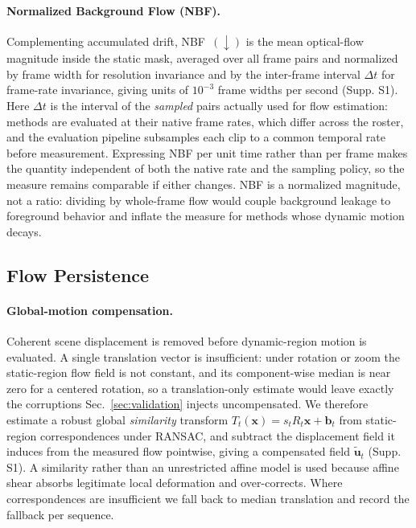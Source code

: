 \paragraph{Normalized Background Flow (NBF).}
Complementing accumulated drift, NBF~$(\downarrow)$ is the mean optical-flow magnitude inside the static mask, averaged over all frame pairs and normalized by frame width for resolution invariance and by the inter-frame interval $\Delta t$ for frame-rate invariance, giving units of $10^{-3}$ frame widths per second (Supp. S1). Here $\Delta t$ is the interval of the \emph{sampled} pairs actually used for flow estimation: methods are evaluated at their native frame rates, which differ across the roster, and the evaluation pipeline subsamples each clip to a common temporal rate before measurement. Expressing NBF per unit time rather than per frame makes the quantity independent of both the native rate and the sampling policy, so the measure remains comparable if either changes. NBF is a normalized magnitude, not a ratio: dividing by whole-frame flow would couple background leakage to foreground behavior and inflate the measure for methods whose dynamic motion decays.

\subsection{Flow Persistence}
\label{sec:flow_metrics}

\paragraph{Global-motion compensation.}
Coherent scene displacement is removed before dynamic-region motion is evaluated. A single translation vector is insufficient: under rotation or zoom the static-region flow field is not constant, and its component-wise median is near zero for a centered rotation, so a translation-only estimate would leave exactly the corruptions Sec.~\ref{sec:validation} injects uncompensated. We therefore estimate a robust global \emph{similarity} transform $T_t(\mathbf{x}) = s_t R_t \mathbf{x} + \mathbf{b}_t$ from static-region correspondences under RANSAC, and subtract the displacement field it induces from the measured flow pointwise, giving a compensated field $\tilde{\mathbf{u}}_t$ (Supp. S1).
A similarity rather than an unrestricted affine model is used because affine shear absorbs legitimate local deformation and over-corrects. Where correspondences are insufficient we fall back to median translation and record the fallback per sequence.

